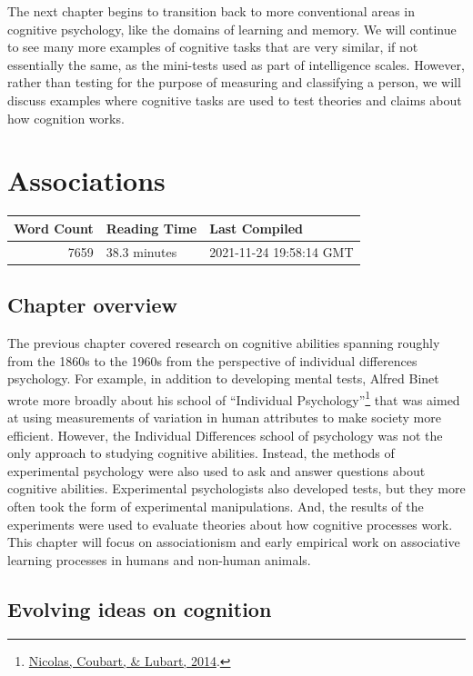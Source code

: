 \documentclass[
  oneside,
  12pt]{crumpbook}
\begin{document}
The next chapter begins to transition back to more conventional areas in cognitive psychology, like the domains of learning and memory. We will continue to see many more examples of cognitive tasks that are very similar, if not essentially the same, as the mini-tests used as part of intelligence scales. However, rather than testing for the purpose of measuring and classifying a person, we will discuss examples where cognitive tasks are used to test theories and claims about how cognition works.

\hypertarget{associations}{%
\chapter{Associations}\label{associations}}

\begin{tabular}{r|l|l}
\hline
Word Count & Reading Time & Last Compiled\\
\hline
7659 & 38.3 minutes & 2021-11-24 19:58:14 GMT\\
\hline
\end{tabular}

\hypertarget{chapter-overview-4}{%
\section{Chapter overview}\label{chapter-overview-4}}

The previous chapter covered research on cognitive abilities spanning roughly from the 1860s to the 1960s from the perspective of individual differences psychology. For example, in addition to developing mental tests, Alfred Binet wrote more broadly about his school of ``Individual Psychology''\footnote{\protect\hyperlink{ref-nicolasProgramIndividualPsychology2014}{Nicolas, Coubart, \& Lubart, 2014}.} that was aimed at using measurements of variation in human attributes to make society more efficient. However, the Individual Differences school of psychology was not the only approach to studying cognitive abilities. Instead, the methods of experimental psychology were also used to ask and answer questions about cognitive abilities. Experimental psychologists also developed tests, but they more often took the form of experimental manipulations. And, the results of the experiments were used to evaluate theories about how cognitive processes work. This chapter will focus on associationism and early empirical work on associative learning processes in humans and non-human animals.

\hypertarget{evolving-ideas-on-cognition}{%
\section{Evolving ideas on cognition}\label{evolving-ideas-on-cognition}}
\end{document}
